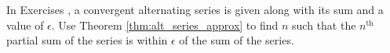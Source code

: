 {\noindent In Exercises}
{, a convergent alternating series is given along with its sum and a value of $\epsilon$. Use Theorem \ref{thm:alt_series_approx} to find $n$ such that the $n^\text{th}$ partial sum of the series is within $\epsilon$ of the sum of the series. 
}
